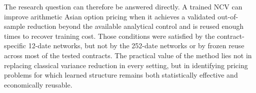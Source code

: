 The research question can therefore be answered directly. A trained NCV can improve arithmetic Asian option pricing when it achieves a validated out-of-sample reduction beyond the available analytical control and is reused enough times to recover training cost. Those conditions were satisfied by the contract-specific 12-date networks, but not by the 252-date networks or by frozen reuse across most of the tested contracts. The practical value of the method lies not in replacing classical variance reduction in every setting, but in identifying pricing problems for which learned structure remains both statistically effective and economically reusable.

